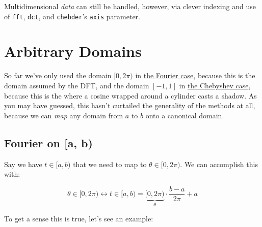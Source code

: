 \documentclass[10pt]{article}
\begin{document}
Multidimensional \textit{data} can still be handled, however, via clever indexing and use of \texttt{fft}, \texttt{dct}, and \texttt{chebder}'s \texttt{axis} parameter.

\section{Arbitrary Domains}

So far we've only used the domain $[0, 2\pi)$ in \hyperref[dft]{the Fourier case}, because this is the domain assumed by the DFT, and the domain $[-1, 1]$ in \hyperref[cylinder]{the Chebyshev case}, because this is the where a cosine wrapped around a cylinder casts a shadow. As you may have guessed, this hasn't curtailed the generality of the methods at all, because we can \textit{map} any domain from $a$ to $b$ onto a canonical domain.

\subsection{Fourier on [a, b)}

Say we have $t \in [a, b)$ that we need to map to $\theta \in [0, 2\pi)$. We can accomplish this with:

$$\theta \in [0, 2\pi) \leftrightarrow t \in [a, b) = \underbrace{[0, 2\pi)}_{\theta} \cdot \frac{b - a}{2\pi} + a$$

\noindent To get a sense this is true, let's see an example:
\end{document}
